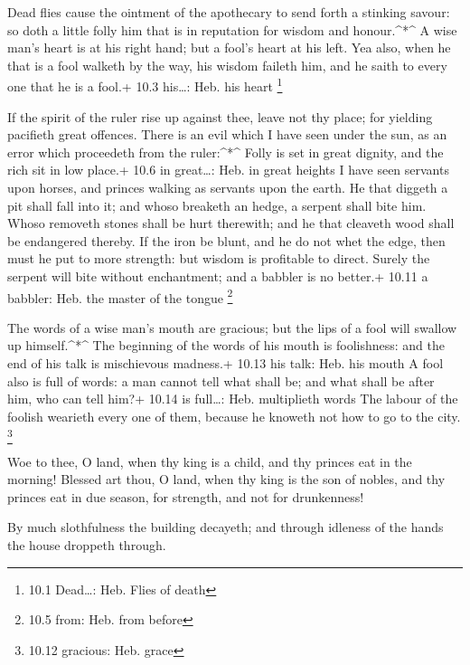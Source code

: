  Dead flies cause the ointment of the apothecary to send
forth a stinking savour: so doth a little folly him that is in
reputation for wisdom and honour.\^{}*\^{}  A wise man's
heart is at his right hand; but a fool's heart at his left. 
Yea also, when he that is a fool walketh by the way, his wisdom faileth
him, and he saith to every one that he is a fool.+ 10.3 his\ldots: Heb.
his heart \footnote{10.1 Dead\ldots: Heb. Flies of death}

 If the spirit of the ruler rise up against thee, leave not
thy place; for yielding pacifieth great offences.  There is
an evil which I have seen under the sun, as an error which proceedeth
from the ruler:\^{}*\^{}  Folly is set in great dignity, and
the rich sit in low place.+ 10.6 in great\ldots: Heb. in great heights
 I have seen servants upon horses, and princes walking as
servants upon the earth.  He that diggeth a pit shall fall
into it; and whoso breaketh an hedge, a serpent shall bite him.
 Whoso removeth stones shall be hurt therewith; and he that
cleaveth wood shall be endangered thereby.  If the iron be
blunt, and he do not whet the edge, then must he put to more strength:
but wisdom is profitable to direct.  Surely the serpent
will bite without enchantment; and a babbler is no better.+ 10.11 a
babbler: Heb. the master of the tongue \footnote{10.5 from: Heb. from
  before}

 The words of a wise man's mouth are gracious; but the lips
of a fool will swallow up himself.\^{}*\^{}  The beginning
of the words of his mouth is foolishness: and the end of his talk is
mischievous madness.+ 10.13 his talk: Heb. his mouth  A
fool also is full of words: a man cannot tell what shall be; and what
shall be after him, who can tell him?+ 10.14 is full\ldots: Heb.
multiplieth words  The labour of the foolish wearieth every
one of them, because he knoweth not how to go to the city. \footnote{10.12
  gracious: Heb. grace}

 Woe to thee, O land, when thy king is a child, and thy
princes eat in the morning!  Blessed art thou, O land, when
thy king is the son of nobles, and thy princes eat in due season, for
strength, and not for drunkenness!

 By much slothfulness the building decayeth; and through
idleness of the hands the house droppeth through.

